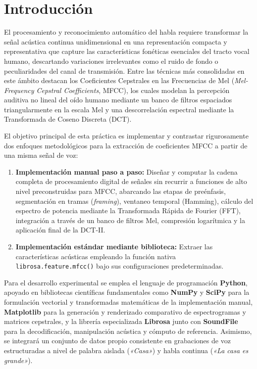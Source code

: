\documentclass[12pt]{article}
\begin{document}
	\section{Introducción}
	El procesamiento y reconocimiento automático del habla requiere transformar la señal acústica continua unidimensional en una representación compacta y representativa que capture las características fonéticas esenciales del tracto vocal humano, descartando variaciones irrelevantes como el ruido de fondo o peculiaridades del canal de transmisión. Entre las técnicas más consolidadas en este ámbito destacan los Coeficientes Cepstrales en las Frecuencias de Mel (\textit{Mel-Frequency Cepstral Coefficients}, MFCC), los cuales modelan la percepción auditiva no lineal del oído humano mediante un banco de filtros espaciados triangularmente en la escala Mel y una descorrelación espectral mediante la Transformada de Coseno Discreta (DCT).
	
	El objetivo principal de esta práctica es implementar y contrastar rigurosamente dos enfoques metodológicos para la extracción de coeficientes MFCC a partir de una misma señal de voz:
	\begin{enumerate}
		\item \textbf{Implementación manual paso a paso:} Diseñar y computar la cadena completa de procesamiento digital de señales sin recurrir a funciones de alto nivel preconstruidas para MFCC, abarcando las etapas de preénfasis, segmentación en tramas (\textit{framing}), ventaneo temporal (Hamming), cálculo del espectro de potencia mediante la Transformada Rápida de Fourier (FFT), integración a través de un banco de filtros Mel, compresión logarítmica y la aplicación final de la DCT-II.
		\item \textbf{Implementación estándar mediante biblioteca:} Extraer las características acústicas empleando la función nativa \texttt{librosa.feature.mfcc()} bajo sus configuraciones predeterminadas.
	\end{enumerate}
	
	Para el desarrollo experimental se emplea el lenguaje de programación \textbf{Python}, apoyado en bibliotecas científicas fundamentales como \textbf{NumPy} y \textbf{SciPy} para la formulación vectorial y transformadas matemáticas de la implementación manual, \textbf{Matplotlib} para la generación y renderizado comparativo de espectrogramas y matrices cepstrales, y la librería especializada \textbf{Librosa} junto con \textbf{SoundFile} para la decodificación, manipulación acústica y cómputo de referencia. Asimismo, se integrará un conjunto de datos propio consistente en grabaciones de voz estructuradas a nivel de palabra aislada (\textit{«Casa»}) y habla continua (\textit{«La casa es grande»}).
	
\end{document}
